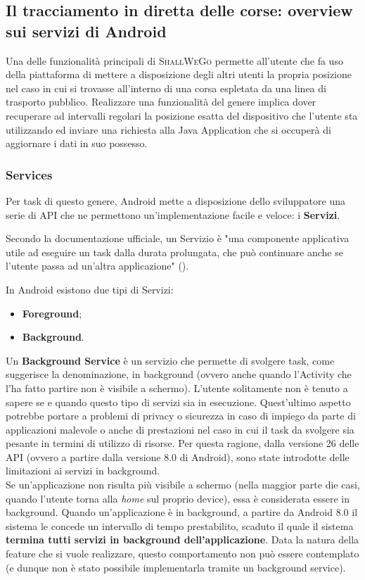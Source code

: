         \subsection{Il tracciamento in diretta delle corse: overview sui servizi di Android}
            Una delle funzionalità principali di \textsc{ShallWeGo} permette all'utente che fa uso della piattaforma di mettere a disposizione degli altri utenti la propria posizione nel caso in cui si trovasse all'interno di una corsa espletata da una linea di trasporto pubblico.
            Realizzare una funzionalità del genere implica dover recuperare ad intervalli regolari la posizione esatta del dispositivo che l'utente sta utilizzando ed inviare una richiesta alla Java Application che si occuperà di aggiornare i dati in suo possesso.
            
            \subsubsection{Services}
                Per task di questo genere, Android mette a disposizione dello sviluppatore una serie di API che ne permettono un'implementazione facile e veloce: i \textbf{Servizi}.

                Secondo la documentazione ufficiale, un Servizio è "una componente applicativa utile ad eseguire un task dalla durata prolungata, che può continuare anche se l'utente passa ad un'altra applicazione" (\cite{AndroidDocService}).

                In Android esistono due tipi di Servizi: 

                \begin{itemize}
                    \item \textbf{Foreground};
                    \item \textbf{Background}.
                \end{itemize}
                Un \textbf{Background Service} è un servizio che permette di svolgere task, come suggerisce la denominazione, in background (ovvero anche quando l'Activity che l'ha fatto partire non è visibile a schermo). L'utente solitamente non è tenuto a sapere se e quando questo tipo di servizi sia in esecuzione. Quest'ultimo aspetto potrebbe portare a problemi di privacy o sicurezza in caso di impiego da parte di applicazioni malevole o anche di prestazioni nel caso in cui il task da svolgere sia pesante in termini di utilizzo di risorse. Per questa ragione, dalla versione 26 delle API (ovvero a partire dalla versione 8.0 di Android), sono state introdotte delle limitazioni ai servizi in background. \\
                Se un'applicazione non risulta più visibile a schermo (nella maggior parte die casi, quando l'utente torna alla \textit{home} sul proprio device), essa è considerata essere in background. Quando un'applicazione è in background, a partire da Android 8.0 il sistema le concede un intervallo di tempo prestabilito, scaduto il quale il sistema \textbf{termina tutti servizi in background dell'applicazione}. Data la natura della feature che si vuole realizzare, questo comportamento non può essere contemplato (e dunque non è stato possibile implementarla tramite un background service).
                
